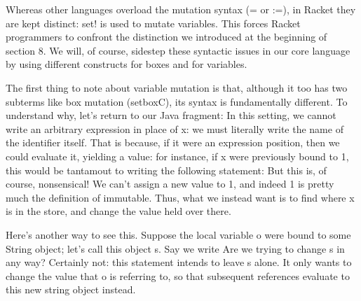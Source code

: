 
Whereas other languages overload the mutation syntax (= or :=), in Racket they
are kept distinct: set! is used to mutate variables. This forces Racket
programmers to confront the distinction we introduced at the beginning of
section 8. We will, of course, sidestep these syntactic issues in our core
language by using different constructs for boxes and for variables.

The first thing to note about variable mutation is that, although it too has two subterms
like box mutation (setboxC), its syntax is fundamentally different. To understand
why, let’s return to our Java fragment:
In this setting, we cannot write an arbitrary expression in place of x: we must
literally write the name of the identifier itself. That is because, if it were
an expression position, then we could evaluate it, yielding a value: for
instance, if x were previously bound to 1, this would be tantamout to writing
the following statement:
But this is, of course, nonsensical! We can’t assign a new value to 1, and
indeed 1 is pretty much the definition of immutable. Thus, what we instead want
is to find where x is in the store, and change the value held over there.

Here’s another way to see this. Suppose the local variable o were bound to some
String object; let’s call this object s. Say we write
Are we trying to change s in any way? Certainly not: this statement intends to
leave s alone. It only wants to change the value that o is referring to, so that
subsequent references evaluate to this new string object instead.

